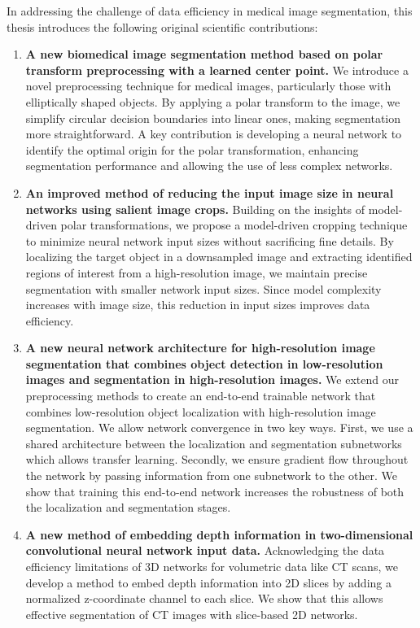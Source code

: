 In addressing the challenge of data efficiency in medical image segmentation, this thesis introduces the following original scientific contributions:

\begin{enumerate}
	\item \textbf{A new biomedical image segmentation method based on polar transform preprocessing with a learned center point.} We introduce a novel preprocessing technique for medical images, particularly those with elliptically shaped objects. By applying a polar transform to the image, we simplify circular decision boundaries into linear ones, making segmentation more straightforward. A key contribution is developing a neural network to identify the optimal origin for the polar transformation, enhancing segmentation performance and allowing the use of less complex networks.
	\item \textbf{An improved method of reducing the input image size in neural networks using salient image crops.} Building on the insights of model-driven polar transformations, we propose a model-driven cropping technique to minimize neural network input sizes without sacrificing fine details. By localizing the target object in a downsampled image and extracting identified regions of interest from a high-resolution image, we maintain precise segmentation with smaller network input sizes. Since model complexity increases with image size, this reduction in input sizes improves data efficiency.
	\item \textbf{A new neural network architecture for high-resolution image segmentation that combines object detection in low-resolution images and segmentation in high-resolution images.} We extend our preprocessing methods to create an end-to-end trainable network that combines low-resolution object localization with high-resolution image segmentation. We allow network convergence in two key ways. First, we use a shared architecture between the localization and segmentation subnetworks which allows transfer learning. Secondly, we ensure gradient flow throughout the network by passing information from one subnetwork to the other. We show that training this end-to-end network increases the robustness of both the localization and segmentation stages.
	\item \textbf{A new method of embedding depth information in two-dimensional convolutional neural network input data.} Acknowledging the data efficiency limitations of 3D networks for volumetric data like CT scans, we develop a method to embed depth information into 2D slices by adding a normalized z-coordinate channel to each slice. We show that this allows effective segmentation of CT images with slice-based 2D networks.
\end{enumerate}

